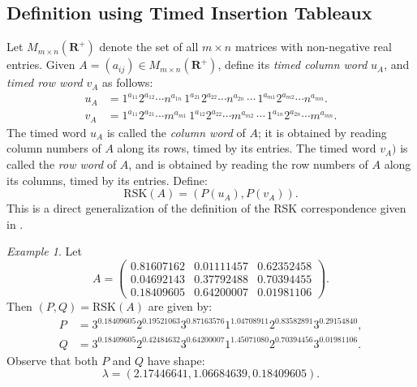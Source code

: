 \documentclass[10pt]{amsproc}
\theoremstyle{definition}
\theoremstyle{remark}
\newtheorem{example}[theorem]{Example}
\newcommand{\rp}{\mathbf{R}^+}
\newcommand{\rsk}{\mathrm{RSK}}
\begin{document}
\subsection{Definition using Timed Insertion Tableaux}
\label{sec:defin-using-timed}
Let $M_{m\times n}(\rp)$ denote the set of all $m\times n$ matrices with non-negative real entries.
Given $A=(a_{ij})\in M_{m\times n}(\rp)$, define its \emph{timed column word} $u_A$, and \emph{timed row word} $v_A$ as follows:
\begin{align*}
  u_A & = 1^{a_{11}}2^{a_{12}}\dotsb n^{a_{1n}}\,1^{a_{21}}2^{a_{22}}\dotsb n^{a_{2n}}\,\dotsb \,1^{a_{m1}}2^{a_{m2}}\dotsb n^{a_{mn}}.\\
  v_A & = 1^{a_{11}}2^{a_{21}}\dotsb m^{a_{m1}}\,1^{a_{12}}2^{a_{22}}\dotsb m^{a_{m2}}\,\dotsb \,1^{a_{1n}}2^{a_{2n}}\dotsb m^{a_{mn}}.
\end{align*}
The timed word $u_A$ is called the \emph{column word} of $A$; it is obtained by reading column numbers of $A$ along its rows, timed by its entries.
The timed word $v_A)$ is called the \emph{row word} of $A$, and is obtained by reading the row numbers of $A$ along its columns, timed by its entries.
Define:
\begin{equation}
  \label{eq:rsk}
  \rsk(A) = (P(u_A), P(v_A)).
\end{equation}
This is a direct generalization of the definition of the RSK correspondence given in \cite[Section~18]{schur_poly}.
\begin{example}
  Let
  \begin{displaymath}
    A = 
    \begin{pmatrix}
      0.81607162 & 0.01111457 & 0.62352458 \\
      0.04692143 & 0.37792488 & 0.70394455 \\
      0.18409605 & 0.64200007 & 0.01981106
    \end{pmatrix}.
  \end{displaymath}
  Then $(P, Q) = \rsk(A)$ are given by:
  \begin{align*}
    P & = 3^{0.18409605}2^{0.19521063}3^{0.87163576}1^{1.04708911}2^{0.83582891}3^{0.29154840},\\
    Q & = 3^{0.18409605}2^{0.42484632}3^{0.64200007}1^{1.45071080}2^{0.70394456}3^{0.01981106}.
  \end{align*}
  Observe that both $P$ and $Q$ have shape:
  \begin{displaymath}
    \lambda = (2.17446641, 1.06684639, 0.18409605).
  \end{displaymath}
\end{example}
\end{document}
